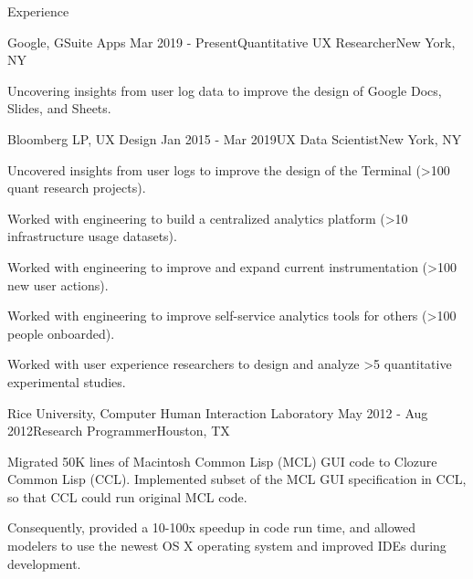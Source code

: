 
\begin{rSection}{Experience}

  \begin{rSubsection}{Google, GSuite Apps}
    {Mar 2019 - Present}{Quantitative UX Researcher}{New York, NY}
  \item Uncovering insights from user log data to improve the design of Google Docs, Slides, and Sheets.
  \end{rSubsection}

  \begin{rSubsection}{Bloomberg LP, UX Design}
    {Jan 2015 - Mar 2019}{UX Data Scientist}{New York, NY}
    \item Uncovered insights from user logs to improve the design of the Terminal (\textgreater100 quant research projects).
    \item Worked with engineering to build a centralized analytics platform (\textgreater10 infrastructure usage datasets).
    \item Worked with engineering to improve and expand current instrumentation (\textgreater100 new user actions).
    \item Worked with engineering to improve self-service analytics tools for others (\textgreater100 people onboarded). 
    \item Worked with user experience researchers to design and analyze \textgreater5 quantitative experimental studies.
  \end{rSubsection}

  \begin{rSubsection}{Rice University, Computer Human Interaction Laboratory}
    {May 2012 - Aug 2012}{Research Programmer}{Houston, TX}
  \item Migrated 50K lines of Macintosh Common Lisp (MCL) GUI code to Clozure Common Lisp (CCL).
    Implemented subset of the MCL GUI specification in CCL, so that CCL could run original MCL code.
  \item Consequently, provided a 10-100x speedup in code run time, and allowed modelers to use the newest OS X operating system and improved IDEs during development.
  \end{rSubsection}


\end{rSection}
